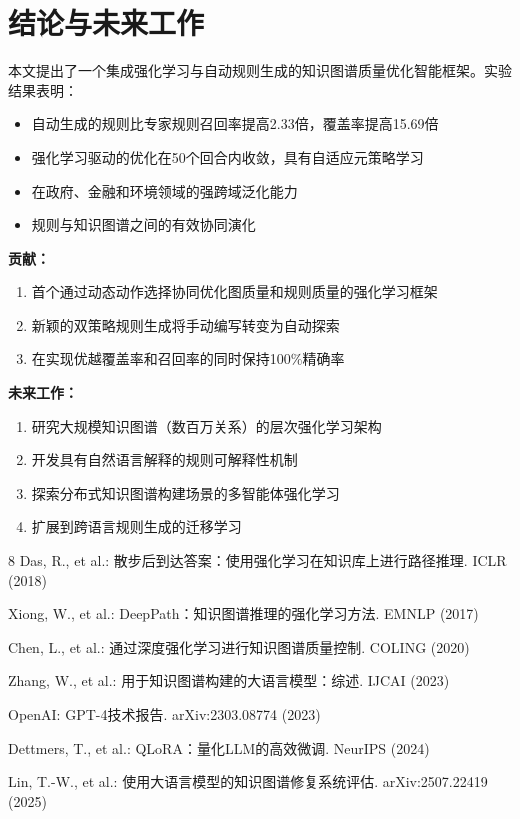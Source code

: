\documentclass[runningheads]{llncs}
\begin{document}
\section{结论与未来工作}

本文提出了一个集成强化学习与自动规则生成的知识图谱质量优化智能框架。实验结果表明：

\begin{itemize}
    \item 自动生成的规则比专家规则召回率提高2.33倍，覆盖率提高15.69倍
    \item 强化学习驱动的优化在50个回合内收敛，具有自适应元策略学习
    \item 在政府、金融和环境领域的强跨域泛化能力
    \item 规则与知识图谱之间的有效协同演化
\end{itemize}

\textbf{贡献：}
\begin{enumerate}
    \item 首个通过动态动作选择协同优化图质量和规则质量的强化学习框架
    \item 新颖的双策略规则生成将手动编写转变为自动探索
    \item 在实现优越覆盖率和召回率的同时保持100\%精确率
\end{enumerate}

\textbf{未来工作：}
\begin{enumerate}
    \item 研究大规模知识图谱（数百万关系）的层次强化学习架构
    \item 开发具有自然语言解释的规则可解释性机制
    \item 探索分布式知识图谱构建场景的多智能体强化学习
    \item 扩展到跨语言规则生成的迁移学习
\end{enumerate}

\begin{thebibliography}{8}
Das, R., et al.: 散步后到达答案：使用强化学习在知识库上进行路径推理. ICLR (2018)

Xiong, W., et al.: DeepPath：知识图谱推理的强化学习方法. EMNLP (2017)

Chen, L., et al.: 通过深度强化学习进行知识图谱质量控制. COLING (2020)

Zhang, W., et al.: 用于知识图谱构建的大语言模型：综述. IJCAI (2023)

OpenAI: GPT-4技术报告. arXiv:2303.08774 (2023)

Dettmers, T., et al.: QLoRA：量化LLM的高效微调. NeurIPS (2024)

Lin, T.-W., et al.: 使用大语言模型的知识图谱修复系统评估. arXiv:2507.22419 (2025)
\end{thebibliography}
\end{document}
